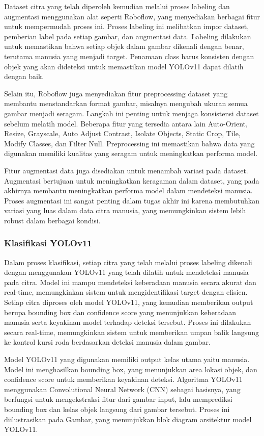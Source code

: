 Dataset citra yang telah diperoleh kemudian melalui proses labeling dan augmentasi menggunakan alat seperti Roboflow, yang menyediakan berbagai fitur untuk mempermudah proses ini. Proses labeling ini melibatkan impor dataset, pemberian label pada setiap gambar, dan augmentasi data. Labeling dilakukan untuk memastikan bahwa setiap objek dalam gambar dikenali dengan benar, terutama manusia yang menjadi target. Penamaan class harus konsisten dengan objek yang akan dideteksi untuk memastikan model YOLOv11 dapat dilatih dengan baik.

Selain itu, Roboflow juga menyediakan fitur preprocessing dataset yang membantu menstandarkan format gambar, misalnya mengubah ukuran semua gambar menjadi seragam. Langkah ini penting untuk menjaga konsistensi dataset sebelum melatih model. Beberapa fitur yang tersedia antara lain Auto-Orient, Resize, Grayscale, Auto Adjust Contrast, Isolate Objects, Static Crop, Tile, Modify Classes, dan Filter Null. Preprocessing ini memastikan bahwa data yang digunakan memiliki kualitas yang seragam untuk meningkatkan performa model.

Fitur augmentasi data juga disediakan untuk menambah variasi pada dataset. Augmentasi bertujuan untuk meningkatkan keragaman dalam dataset, yang pada akhirnya membantu meningkatkan performa model dalam mendeteksi manusia. Proses augmentasi ini sangat penting dalam tugas akhir ini karena membutuhkan variasi yang luas dalam data citra manusia, yang memungkinkan sistem lebih robust dalam berbagai kondisi.

\subsubsection{Klasifikasi YOLOv11}
\label{subsubsec:klasifikasiYOLOv11}

Dalam proses klasifikasi, setiap citra yang telah melalui proses labeling dikenali dengan menggunakan YOLOv11 yang telah dilatih untuk mendeteksi manusia pada citra. Model ini mampu mendeteksi keberadaan manusia secara akurat dan real-time, memungkinkan sistem untuk mengidentifikasi target dengan efisien. Setiap citra diproses oleh model YOLOv11, yang kemudian memberikan output berupa bounding box dan confidence score yang menunjukkan keberadaan manusia serta keyakinan model terhadap deteksi tersebut. Proses ini dilakukan secara real-time, memungkinkan sistem untuk memberikan umpan balik langsung ke kontrol kursi roda berdasarkan deteksi manusia dalam gambar.

Model YOLOv11 yang digunakan memiliki output kelas utama yaitu manusia. Model ini menghasilkan bounding box, yang menunjukkan area lokasi objek, dan confidence score untuk memberikan keyakinan deteksi. Algoritma YOLOv11 menggunakan Convolutional Neural Network (CNN) sebagai basisnya, yang berfungsi untuk mengekstraksi fitur dari gambar input, lalu memprediksi bounding box dan kelas objek langsung dari gambar tersebut. Proses ini diilustrasikan pada Gambar, yang menunjukkan blok diagram arsitektur model YOLOv11.

